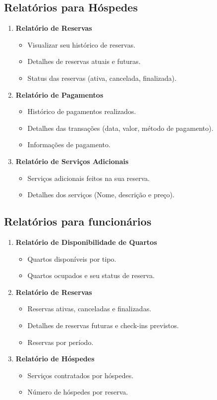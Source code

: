 \subsection{Relatórios para Hóspedes}
\begin{enumerate}
    \item \textbf{Relatório de Reservas}
    \begin{itemize}
        \item Visualizar seu histórico de reservas.
        \item Detalhes de reservas atuais e futuras.
        \item Status das reservas (ativa, cancelada, finalizada).
    \end{itemize}
    \item \textbf{Relatório de Pagamentos}
    \begin{itemize}
        \item Histórico de pagamentos realizados.
        \item Detalhes das transações (data, valor, método de pagamento).
        \item Informações de pagamento.
    \end{itemize}
    \item \textbf{Relatório de Serviços Adicionais}
    \begin{itemize}
        \item Serviços adicionais feitos na sua reserva.
        \item Detalhes dos serviços (Nome, descrição e preço).
    \end{itemize}
\end{enumerate}

\subsection{Relatórios para funcionários}
\begin{enumerate}
    \item \textbf{Relatório de Disponibilidade de Quartos}
    \begin{itemize}
        \item Quartos disponíveis por tipo.
        \item Quartos ocupados e seu status de reserva.
    \end{itemize}
    \item \textbf{Relatório de Reservas}
    \begin{itemize}
        \item Reservas ativas, canceladas e finalizadas.
        \item Detalhes de reservas futuras e check-ins previstos.
        \item Reservas por período.
    \end{itemize}
    \item \textbf{Relatório de Hóspedes}
    \begin{itemize}
        \item Serviços contratados por hóspedes.
        \item Número de hóspedes por reserva.
    \end{itemize}
\end{enumerate}



% 
